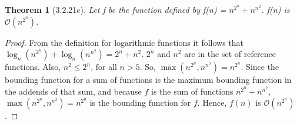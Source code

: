 \documentclass[a4paper, 12pt]{article}
\theoremstyle{plain}
\newtheorem*{theorem*}{Theorem}
\begin{document}
	
	\begin{theorem*}[3.2.21c]
		Let f be the function defined by f(n) = $n^{2^{n}} + n^{n^{2}}$. \newline f(n) is $\mathcal{O}(n^{2^{n}})$.
	\end{theorem*}
	
	\begin{proof}
		From the definition for logarithmic functions it follows that \newline $\log_n (n^{2^{n}}) + \log_n (n^{n^{2}}) = 2^n + n^2$. $2^n$ and $n^2$ are in the set of reference functions. Also, $n^2 \le 2^n$, for all $n > 5$. So, $\max(n^{2^{n}}, n^{n^{2}}) = n^{2^{n}}$. Since the bounding function for a sum of functions is the maximum bounding function in the addends of that sum, and because $f$ is the sum of functions $n^{2^{n}} + n^{n^{2}}$, $\max(n^{2^{n}}, n^{n^{2}}) = n^{2^{n}}$ is the bounding function for $f$. Hence, $f(n)$ is $\mathcal{O}(n^{2^{n}})$.
	\end{proof}
\end{document}
